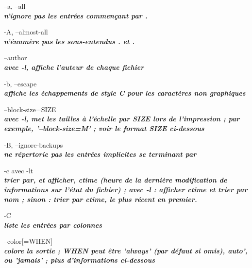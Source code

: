 \documentclass{article}
\begin{document}
\par --a, --all\\
		\textit{\textbf{n'ignore pas les entrées commençant par .}}\\

\par -A, --almost-all\\
		\textit{\textbf{n'énumère pas les sous-entendus . et .}}\\

\par --author\\
              \textit{\textbf{avec -l, affiche l'auteur de chaque fichier}}\\

   \par-b, --escape\\
              \textit{\textbf{affiche les échappements de style C pour les caractères non graphiques}}\\

       \par--block-size=SIZE\\
             \textit{\textbf{ avec -l, met les tailles à l'échelle par SIZE lors de l'impression ; par exemple,
              '--block-size=M' ; voir le format SIZE ci-dessous}}\\

      \par -B, --ignore-backups\\
               \textit{\textbf{ne répertorie pas les entrées implicites se terminant par ~}}\\

      \par -c avec -lt \\
		  \textit{\textbf{trier par, et afficher, ctime (heure de la dernière modification de
              informations sur l'état du fichier) ; avec -l : afficher ctime et trier par nom ;
              sinon : trier par ctime, le plus récent en premier.}}\\

       \par-C \\
	 \textit{\textbf{liste les entrées par colonnes}}\\


       \par --color[=WHEN] \\
               \textit{\textbf{colore la sortie ; WHEN peut être 'always' (par défaut si omis),
              auto', ou 'jamais' ; plus d'informations ci-dessous}}\\
\end{document}
